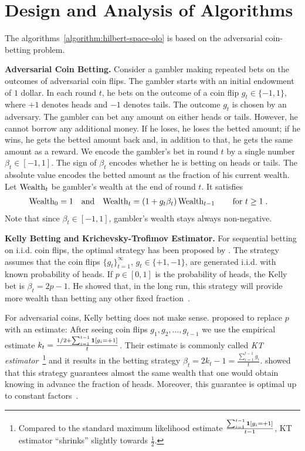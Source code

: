 \section{Design and Analysis of Algorithms}

The algorithms~\ref{algorithm:hilbert-space-olo}
is based on the adversarial coin-betting problem.

\textbf{Adversarial Coin Betting.}
Consider a gambler making
repeated bets on the outcomes of adversarial coin flips. The gambler starts with an
initial endowment of $1$ dollar. In each round $t$, he bets on the outcome of a
coin flip $g_t \in \{-1,1\}$, where $+1$ denotes heads and $-1$ denotes tails.
The outcome $g_t$ is chosen by an adversary.
The gambler can bet any amount on either heads or tails. However, he cannot borrow
any additional money. If he loses, he loses the betted
amount; if he wins, he gets the betted amount back and, in addition to that, he
gets the same amount as a reward.  We encode the gambler's bet in round $t$ by a
single number $\beta_t \in [-1,1]$. The sign of $\beta_t$ encodes whether he is
betting on heads or tails. The absolute value encodes the betted amount as the
fraction of his current wealth.
Let $\operatorname{Wealth}_t$ be gambler's wealth at the end of round $t$. It satisfies
\begin{align}
\label{equation:wealth-recurrence}
\operatorname{Wealth}_0 & = 1 &
& \text{and} &
\operatorname{Wealth}_t & = (1 + g_t \beta_t) \operatorname{Wealth}_{t-1} \qquad \text{for $t \ge 1$} \; .
\end{align}
Note that since $\beta_t \in [-1,1]$, gambler's wealth stays always non-negative.

\textbf{Kelly Betting and Krichevsky-Trofimov Estimator.}
For sequential betting on i.i.d. coin flips, the optimal strategy has been proposed by \citet{Kelly-1956}.
The strategy assumes that the coin flips $\{g_t\}_{t=1}^\infty$, $g_t
\in \{+1,-1\}$, are generated i.i.d. with known probability of heads. If $p \in
[0,1]$ is the probability of heads, the Kelly bet is $\beta_t = 2p - 1$. He
showed that, in the long run, this strategy will provide more wealth than
betting any other fixed fraction~\cite{Kelly-1956}.

For adversarial coins, Kelly betting does not make sense.
\citet{Krichevsky-Trofimov-1981} proposed to replace $p$ with an estimate:
After seeing coin flips
$g_1, g_2, \dots, g_{t-1}$ we use the empirical estimate $k_t = \frac{1/2 +
\sum_{i=1}^{t-1} \mathbf{1}[g_i = +1]}{t}$. Their
estimate is commonly called \emph{KT estimator}~\footnote{Compared to the
standard maximum likelihood estimate $\frac{\sum_{i=1}^{t-1} \mathbf{1}[g_i =
+1]}{t-1}$, KT estimator ``shrinks'' slightly towards $\frac{1}{2}$.} and it
results in the betting strategy $\beta_t = 2k_t - 1 = \tfrac{\sum_{i=1}^{t-1}
g_i}{t}$.  \citeauthor{Krichevsky-Trofimov-1981} showed that this strategy
guarantees almost the same wealth that one would obtain knowing in advance the
fraction of heads. Moreover, this guarantee is optimal up to constant
factors~\citep{Cesa-Bianchi-Lugosi-2006}.

